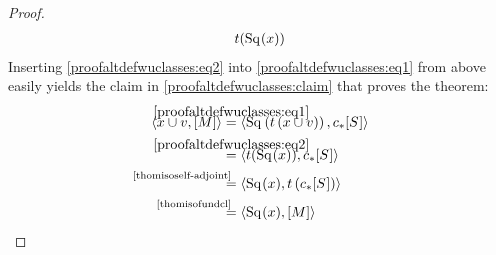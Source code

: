 \begin{Thm}
\begin{proof}
\begin{align}
        t(\mathrm{Sq}^{}(x))
    \end{align}
    Inserting \eqref{proofaltdefwuclasses:eq2} into
    \eqref{proofaltdefwuclasses:eq1} from above easily yields the
    claim in \eqref{proofaltdefwuclasses:claim} that proves the theorem:
    \begin{align*}
      \capped{x\cup \v}{\fundcl M}
      &\overset{\mathclap{\eqref{proofaltdefwuclasses:eq1}}}=
        \capped
        {\Sq{}\left(\thomiso\left(x\cup\v\right)\right)}
        {\pf\collapse\fundcl{\Sphere{}}}
      \\
      &\overset{\mathclap{\eqref{proofaltdefwuclasses:eq2}}}=
        \capped
        {\thomiso(\Sq{}(x))}
        {\pf\collapse\fundcl{\Sphere{}}}
      \\
      &\equalsby{\autoref{thomisoself-adjoint}}
        \capped
        {\Sq{}(x)}
        {\thomiso\left(\pf\collapse\fundcl{\Sphere{}}\right)}
      \\
      &\equalsby{\autoref{thomisofundcl}}
        \capped
        {\Sq{}(x)}
        {\fundcl M}
        \qedhere
    \end{align*}
  \end{proof}
\end{Thm}


